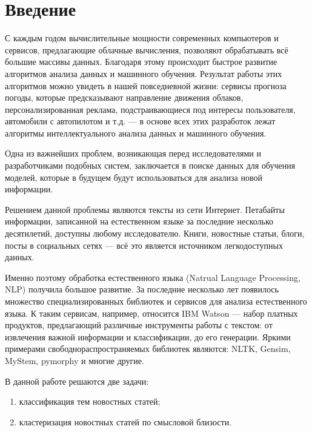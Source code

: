 \documentclass[a4paper, 14pt]{extarticle}
\begin{document}

\section{Введение}
С каждым годом вычислительные мощности современных компьютеров и сервисов, 
предлагающие облачные вычисления, позволяют 
обрабатывать всё большие массивы данных. Благодаря этому происходит быстрое 
развитие алгоритмов анализа данных и машинного обучения. Результат работы 
этих алгоритмов можно увидеть в нашей повседневной жизни: 
сервисы прогноза погоды, которые предсказывают направление движения 
облаков, персонализированная реклама, подстраивающиеся под 
интересы пользователя, автомобили с автопилотом и т.д. --- в основе всех 
этих разработок лежат алгоритмы интеллектуального анализа данных и 
машинного обучения.

Одна из важнейших проблем, возникающая перед исследователями и 
разработчиками подобных систем, заключается в поиске данных для обучения моделей,
которые в будущем будут использоваться для анализа новой информации.

Решением данной проблемы являются тексты из сети Интернет.
Петабайты информации, записанной на естественном языке за последние несколько 
десятилетий, доступны любому исследователю. Книги, новостные статьи, блоги, посты в 
социальных сетях --- всё это является источником легкодоступных данных.

Именно поэтому обработка естественного языка (Natrual Language Processing, 
NLP) получила большое развитие. За последние несколько лет появилось множество 
специализированных библиотек и сервисов для анализа естественного языка. К таким сервисам, 
например, относится IBM Watson --- набор платных продуктов, предлагающий различные
инструменты работы с текстом: от извлечения важной информации и 
классификации, до его генерации. %
Яркими примерами свободнораспространяемых библиотек являются: NLTK, Gensim, MyStem,
pymorphy и многие другие.

В данной работе решаются две задачи:
\begin{enumerate}
	\item классификация тем новостных статей;
	\item кластеризация новостных статей по смысловой близости.
\end{enumerate} 
\end{document}

